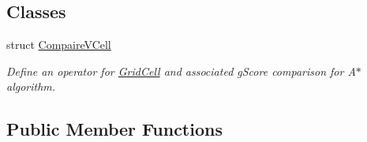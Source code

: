 \subsection*{Classes}
\begin{DoxyCompactItemize}
\item 
struct \hyperlink{structGridMap_1_1CompaireVCell}{Compaire\+V\+Cell}
\begin{DoxyCompactList}\small\item\em Define an operator for \hyperlink{classGridCell}{Grid\+Cell} and associated g\+Score comparison for A$\ast$ algorithm. \end{DoxyCompactList}\end{DoxyCompactItemize}
\subsection*{Public Member Functions}
